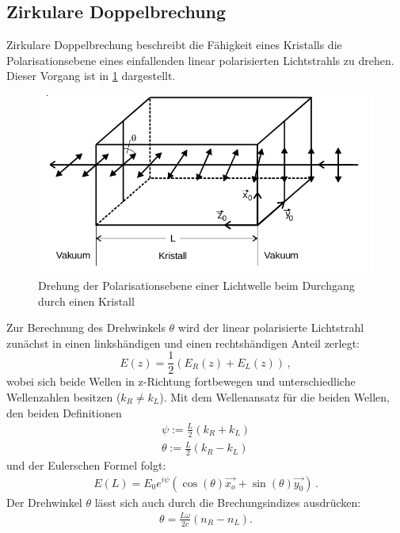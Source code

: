 \subsection{Zirkulare Doppelbrechung}
Zirkulare Doppelbrechung beschreibt die Fähigkeit eines Kristalls die Polarisationsebene eines einfallenden linear polarisierten Lichtstrahls zu drehen. Dieser Vorgang ist in \ref{fig:Bild1}
dargestellt.
\begin{figure}
	  \centering
	  \includegraphics[width=1\textwidth]{pictures/drehung.png}
	         \caption{Drehung der Polarisationsebene einer Lichtwelle beim Durchgang durch einen Kristall \cite{Anleitung}
		 }
		   \label{fig:Bild1}
\end{figure}
Zur Berechnung des Drehwinkels $\theta$ wird der linear polarisierte Lichtstrahl zunächst in einen linkshändigen und einen rechtshändigen Anteil zerlegt:
\begin{equation*}
	E(z)= \frac{1}{2}(E_R(z)+E_L(z)) \, \mathrm{,}
\end{equation*}
wobei sich beide Wellen in z-Richtung fortbewegen und unterschiedliche Wellenzahlen besitzen ($k_R \neq k_L$).
Mit dem Wellenansatz für die beiden Wellen, den beiden Definitionen
\begin{align}\label{Winkel}
	\psi := \frac{L}{2} (k_R + k_L) \\\nonumber
	\theta := \frac{L}{2} (k_R - k_L)
\end{align}
und der Eulerschen Formel folgt:
\begin{align}
	E(L)=E_0 e^{i\psi}(\cos(\theta ) \vec{x_o} + \sin(\theta ) \vec{y_0} ) \, \mathrm{.}
\end{align}
Der Drehwinkel $\theta$ lässt sich auch durch die Brechungsindizes ausdrücken:
\begin{align*}
	\theta = \frac{L \omega}{2 c} (n_R - n_L) \mathrm{.}
\end{align*}
